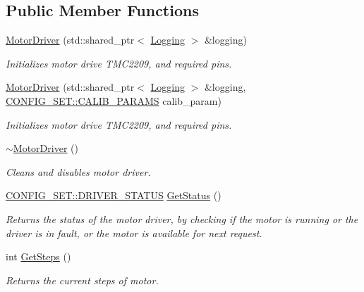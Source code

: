 \subsection*{Public Member Functions}
\begin{DoxyCompactItemize}
\item 
\hyperlink{classMotorDriver_ac03c1c5c2ac455e46fe196881641b366}{Motor\+Driver} (std\+::shared\+\_\+ptr$<$ \hyperlink{classLogging}{Logging} $>$ \&logging)
\begin{DoxyCompactList}\small\item\em Initializes motor drive T\+M\+C2209, and required pins. \end{DoxyCompactList}\item 
\hyperlink{classMotorDriver_a534f4ca22b5dcffc9e40aafef09c76e5}{Motor\+Driver} (std\+::shared\+\_\+ptr$<$ \hyperlink{classLogging}{Logging} $>$ \&logging, \hyperlink{structCONFIG__SET_1_1CALIB__PARAMS}{C\+O\+N\+F\+I\+G\+\_\+\+S\+E\+T\+::\+C\+A\+L\+I\+B\+\_\+\+P\+A\+R\+A\+MS} calib\+\_\+param)
\begin{DoxyCompactList}\small\item\em Initializes motor drive T\+M\+C2209, and required pins. \end{DoxyCompactList}\item 
\hyperlink{classMotorDriver_a6ead9d8f796501adf9889a8e5aa7afc5}{$\sim$\+Motor\+Driver} ()
\begin{DoxyCompactList}\small\item\em Cleans and disables motor driver. \end{DoxyCompactList}\item 
\hyperlink{namespaceCONFIG__SET_a722f4ba49e35faf1a2504aa23677b2f0}{C\+O\+N\+F\+I\+G\+\_\+\+S\+E\+T\+::\+D\+R\+I\+V\+E\+R\+\_\+\+S\+T\+A\+T\+US} \hyperlink{classMotorDriver_a1a33492e58ce3c13cd3c090c704b1734}{Get\+Status} ()
\begin{DoxyCompactList}\small\item\em Returns the status of the motor driver, by checking if the motor is running or the driver is in fault, or the motor is available for next request. \end{DoxyCompactList}\item 
int \hyperlink{classMotorDriver_aaf134c97d67e0ce422853cc1cb7684a9}{Get\+Steps} ()
\begin{DoxyCompactList}\small\item\em Returns the current steps of motor. \end{DoxyCompactList}\item 

\end{DoxyCompactItemize}
